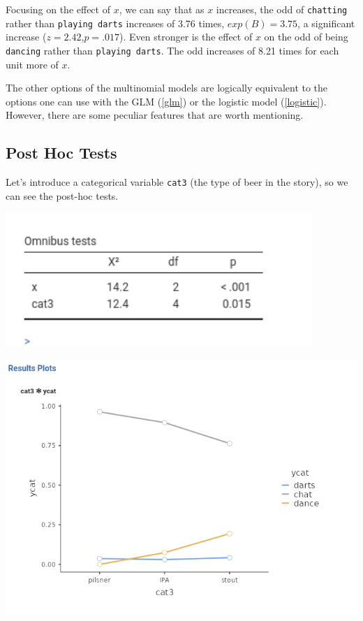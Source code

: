 \documentclass[
]{book}
\begin{document}
Focusing on the effect of \(x\), we can say that as \(x\) increases, the odd of \texttt{chatting} rather than \texttt{playing\ darts} increases of 3.76 times, \(exp(B)=3.75\), a significant increase (\(z=2.42\),\(p=.017\)). Even stronger is the effect of \(x\) on the odd of being \texttt{dancing} rather than \texttt{playing\ darts}. The odd increases of 8.21 times for each unit more of \(x\).

The other options of the multinomial models are logically equivalent to the options one can use with the GLM (\ref{glm}) or the logistic model (\ref{logistic}). However, there are some peculiar features that are worth mentioning.

\hypertarget{post-hoc-tests-1}{%
\subsection{Post Hoc Tests}\label{post-hoc-tests-1}}

Let's introduce a categorical variable \texttt{cat3} (the type of beer in the story), so we can see the post-hoc tests.

\includegraphics[width=4.56in]{bookletpics/3_multi_output5}

\includegraphics[width=9.44in]{bookletpics/3_multi_plot3}
\end{document}
